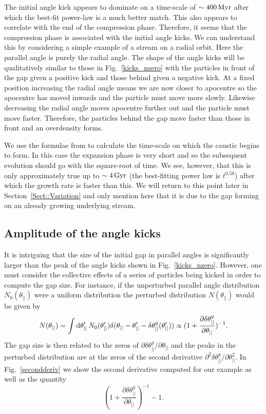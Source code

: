 \documentclass[useAMS,usenatbib,fleqn,a4paper]{mn2e}
\def\Gyr{\,{\rm Gyr}}
\def\Myr{\,{\rm Myr}}
\begin{document}
The initial angle kick appears to dominate on a time-scale of $\sim400\Myr$ after which the best-fit power-law is a much better match. This also appears to correlate with the end of the compression phase. Therefore, it seems that the compression phase is associated with the initial angle kicks. We can understand this by considering a simple example of a stream on a radial orbit. Here the parallel angle is purely the radial angle. The shape of the angle kicks will be qualitatively similar to those in Fig.~\ref{kicks_nzero} with the particles in front of the gap given a positive kick and those behind given a negative kick. At a fixed position increasing the radial angle means we are now closer to apocentre so the apocentre has moved inwards and the particle must move more slowly. Likewise decreasing the radial angle moves apocentre further out and the particle must move faster. Therefore, the particles behind the gap move faster than those in front and an overdensity forms.

We use the formulae from \cite{ErkalBelokurov2015} to calculate the time-scale on which the caustic begins to form. In this case the expansion phase is very short and so the subsequent evolution should go with the square-root of time. We see, however, that this is only approximately true up to $\sim4\Gyr$ (the best-fitting power law is $t^{0.58}$) after which the growth rate is faster than this. We will return to this point later in Section~\ref{Sect::Variation} and only mention here that it is due to the gap forming on an already growing underlying stream.

\subsection{Amplitude of the angle kicks}

It is intriguing that the size of the initial gap in parallel angles is significantly larger than the peak of the angle kicks shown in Fig.~\ref{kicks_nzero}. However, one must consider the collective effects of a series of particles being kicked in order to compute the gap size. For instance, if the unperturbed parallel angle distribution $N_0(\theta_{||})$ were a uniform distribution the perturbed distribution $N(\theta_{||})$ would be given by
\begin{equation}
N(\theta_{||})=\int {\rm d}\theta'_{||}\,N_0(\theta'_{||})\delta(\theta_{||}-\theta'_{||}-\delta\theta^g_{||}(\theta'_{||}))\propto(1+\frac{\partial\delta\theta^g_{||}}{\partial\theta_{||}})^{-1}.
\label{UniformAssump}
\end{equation}
The gap size is then related to the zeros of $\partial\delta\theta^g_{||}/\partial\theta_{||}$
and the peaks in the perturbed distribution are at the zeros of the second derivative
$
\partial^2\delta\theta^g_{||}/\partial\theta^{2}_{||}.
$
In Fig.~\ref{secondderiv} we show the second derivative computed for our example as well as the quantity
\begin{equation}
(1+\frac{\partial\delta\theta^g_{||}}{\partial\theta_{||}})^{-1}-1.
\label{deriv}
\end{equation}
\end{document}
